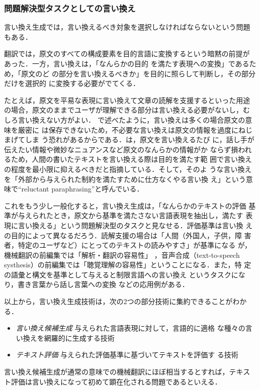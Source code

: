 \subsubsection{問題解決型タスクとしての言い換え}
\label{sssec:problem_solving}

言い換え生成では，言い換えるべき対象を選択しなければならないという問題
もある．

翻訳では，原文のすべての構成要素を目的言語に変換するという暗黙の前提が
あった\cite{verbmobil:00,EBMT:03}．一方，言い換えは，「なんらかの目的
を満たす表現への変換」\cite{YamamotoKazuhide:01}であるため，「原文のど
の部分を言い換えるべきか」を目的に照らして判断し，その部分だけを選択的
に変換する必要がでてくる．

たとえば，原文を平易な表現に言い換えて文章の読解を支援するといった用途
の場合，原文のままでユーザが理解できる部分は言い換える必要がないし，む
しろ言い換えない方がよい\cite{dras:99:a,inui:01:a,inui:03:a}．
で述べたように，言い換えは多くの場合原文の意味を厳密に
は保存できないため，不必要な言い換えは原文の情報を過度にねじまげてしま
う恐れがあるからである．\citeauthor{dras:99:a}は，原文を言い換えるたび
に，話し手が伝えたい情報や微妙なニュアンスなど原文のなんらかの情報がか
ならず損われるため，人間の書いたテキストを言い換える際は目的を満たす範
囲で言い換えの程度を最小限に抑えるべきだと指摘している．そして，そのよ
うな言い換えを「外部から与えられた制約を満たすために仕方なくやる言い換
え」という意味で``reluctant paraphrasing''と呼んでいる．

これをもう少し一般化すると，言い換え生成は，「なんらかのテキストの評価
基準が与えられたとき，原文から基準を満たさない言語表現を抽出し，満たす
表現に言い換える」という問題解決型のタスクと見なせる．評価基準は言い換
えの目的によって異なるだろう．読解支援の場合は「人間（外国人，子供，障
害者，特定のユーザなど）にとってのテキストの読みやすさ」が基準になる
\cite{carroll:98:a,canning:99:a,inui:01:a,higashinaka:02,inui:03:a}が，
機械翻訳の前編集では「解析・翻訳の容易性」
\cite{shirai:95:a,kato:97:a,yoshimi:00:b}，音声合成（text-to-speech
systhesis）の前編集では「聴覚理解の容易性」ということになる．また，特
定の語彙と構文を基準として与えると制限言語への言い換え
\cite{mitamura:01}というタスクになり，書き言葉から話し言葉への変換
\cite{kaji:04:c}などの応用例がある．

以上から，言い換え生成技術は，次の2つの部分技術に集約できることがわか
る．
\begin{itemize}
\item \emph{言い換え候補生成} 与えられた言語表現に対して，言語的に適格
な種々の言い換えを網羅的に生成する技術
\item \emph{テキスト評価} 与えられた評価基準に基づいてテキストを評価す
る技術
\end{itemize}
言い換え候補生成が通常の意味での機械翻訳にほぼ相当するとすれば，テキス
ト評価は言い換えになって初めて顕在化される問題であるといえる．

